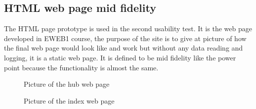 \subsection{HTML web page mid fidelity}
The HTML page prototype is used in the second usability test. It is the web page developed in EWEB1 course, the purpose of the site is to give at picture of how the final web page would look like and work but without any data reading and logging, it is a static web page. It is defined to be mid fidelity like the power point because the functionality is almost the same.
\begin{figure}[H]
	\center
		\setlength\fboxsep{0pt}
		\setlength\fboxrule{1pt}
   	\caption{Picture of the hub web page}
   	\label{fig:web_hub_interface}
\end{figure}
\begin{figure}[H]
	\center
		\setlength\fboxsep{0pt}
		\setlength\fboxrule{1pt}
   	\caption{Picture of the index web page}
   	\label{fig:web_index_interface}
\end{figure}
